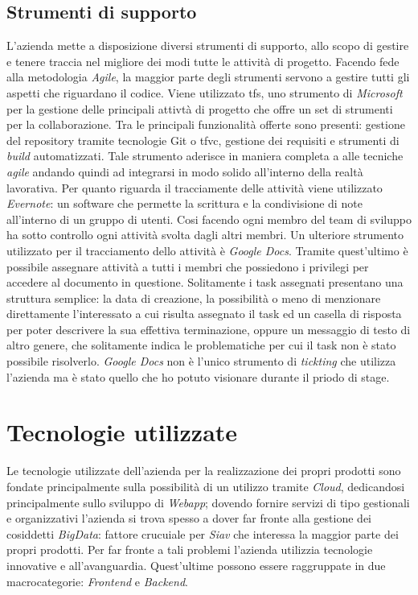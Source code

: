 \subsection{Strumenti di supporto }
L'azienda mette a disposizione diversi strumenti di supporto, allo scopo di gestire e tenere traccia nel migliore dei modi tutte le attività di progetto.
Facendo fede alla metodologia \textit{Agile}, la maggior parte degli strumenti servono a gestire tutti gli aspetti che riguardano il codice. Viene utilizzato \gls{tfs}, uno strumento di \textit{Microsoft} per la gestione delle principali attivtà di progetto che offre un set di strumenti per la collaborazione. Tra le principali funzionalità offerte sono presenti: gestione del repository tramite tecnologie Git o \gls{tfvc}, gestione dei requisiti e strumenti di \textit{build} automatizzati. Tale strumento aderisce in maniera completa a alle tecniche \textit{agile} andando quindi ad integrarsi in modo solido all'interno della realtà lavorativa. Per quanto riguarda il tracciamente delle attività viene utilizzato \textit{Evernote}: un software che permette la scrittura e la condivisione di note all'interno di un gruppo di utenti. Cosi facendo ogni membro del team di sviluppo ha sotto controllo ogni attività svolta dagli altri membri. Un ulteriore strumento utilizzato per il tracciamento dello attività è \textit{Google Docs}. Tramite quest'ultimo è possibile assegnare attività a tutti i membri che possiedono i privilegi per accedere al documento in questione. Solitamente i task assegnati presentano una struttura semplice: la data di creazione, la possibilità o meno di menzionare direttamente l'interessato a cui risulta assegnato il task ed un casella di risposta per poter descrivere la sua effettiva terminazione, oppure un messaggio di testo di altro genere, che solitamente indica le problematiche per cui il task non è stato possibile risolverlo. \textit{Google Docs} non è l'unico strumento di \textit{tickting} che utilizza l'azienda ma è stato quello che ho potuto visionare durante il priodo di stage.
\section {Tecnologie utilizzate}
Le tecnologie utilizzate dell'azienda per la realizzazione dei propri prodotti sono fondate principalmente sulla possibilità di un utilizzo tramite \textit{\gls{Cloud}}, dedicandosi principalmente sullo sviluppo di \textit{Webapp}; dovendo fornire servizi di tipo gestionali e organizzativi l'azienda si trova spesso a dover far fronte alla gestione dei cosiddetti \textit{\gls{BigData}}: fattore crucuiale per \textit{Siav} che interessa la maggior parte dei propri prodotti. Per far fronte a tali problemi l'azienda utilizzia tecnologie innovative e all'avanguardia. Quest'ultime possono essere raggruppate in due macrocategorie: \textit{Frontend} e \textit{Backend}.
